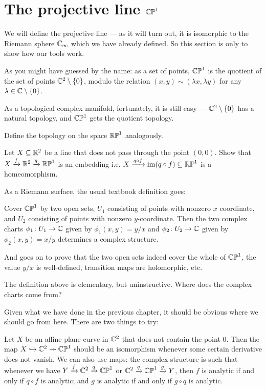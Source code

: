 \section{The projective line $\mathbb{CP}^1$}
We will define the projective line --- as it will turn out, it is isomorphic to the Riemann sphere
$\mathbb C_\infty$ which we have already defined. So this section is only to show how our tools work.

As you might have guessed by the name: as a set of points, $\mathbb{CP}^1$ is the quotient of the set of
points $\mathbb C^2 \setminus \{ 0 \}$, modulo the relation $(x, y) \sim (\lambda x, \lambda y)$ for
any $\lambda \in \mathbb C \setminus \{ 0 \}$.

As a topological complex manifold, fortunately, it is still easy --- $\mathbb C^2 \setminus \{ 0 \}$
has a natural topology, and $\mathbb{CP}^1$ gets the quotient topology.
\begin{exercise}
	Define the topology on the space $\mathbb{RP}^1$ analogously.
\end{exercise}
\begin{exercise}
	Let $X \subseteq \mathbb R^2$ be a line that does not pass through the point $(0, 0)$.
	Show that $X \xrightarrow{f} \mathbb R^2 \xrightarrow{q} \mathbb{RP}^1$ is an embedding i.e.
	$X \xrightarrow{q \circ f} \operatorname{im}(q \circ f) \subseteq \mathbb{RP}^1$ is a homeomorphism.
\end{exercise}

As a Riemann surface, the usual textbook definition goes:
\begin{definition}
	Cover $\mathbb{CP}^1$ by two open sets, $U_1$ consisting of points with nonzero $x$ coordinate,
	and $U_2$ consisting of points with nonzero $y$-coordinate.
	Then the two complex charts $\phi_1 \colon U_1 \to \mathbb C$ given by $\phi_1(x, y) = y/x$
	and $\phi_2 \colon U_2 \to \mathbb C$ given by $\phi_2(x, y) = x/y$
	determines a complex structure.
\end{definition}
And goes on to prove that the two open sets indeed cover the whole of $\mathbb{CP}^1$,
the value $y/x$ is well-defined, transition maps are holomorphic, etc.

The definition above is elementary, but uninstructive. Where does the complex charts come from?

Given what we have done in the previous chapter, it should be obvious where we should go from here.
There are two things to try:

\begin{itemize}
	\ii Let $X$ be an affine plane curve in $\mathbb C^2$ that does not contain the point $0$.
	Then the map $X \hookrightarrow \mathbb C^2 \twoheadrightarrow \mathbb{CP}^1$ should be an isomorphism whenever some certain
	derivative does not vanish.
	\ii We can also use maps: the complex structure is such that whenever we have $Y \xrightarrow{f} \mathbb C^2
	\xrightarrow{q} \mathbb{CP}^1$ or $\mathbb C^2 \xrightarrow{q} \mathbb{CP}^1 \xrightarrow{g} Y$, then $f$ is analytic if and only if $q
	\circ f$ is analytic; and $g$ is analytic if and only if $g \circ q$ is analytic.
\end{itemize}

